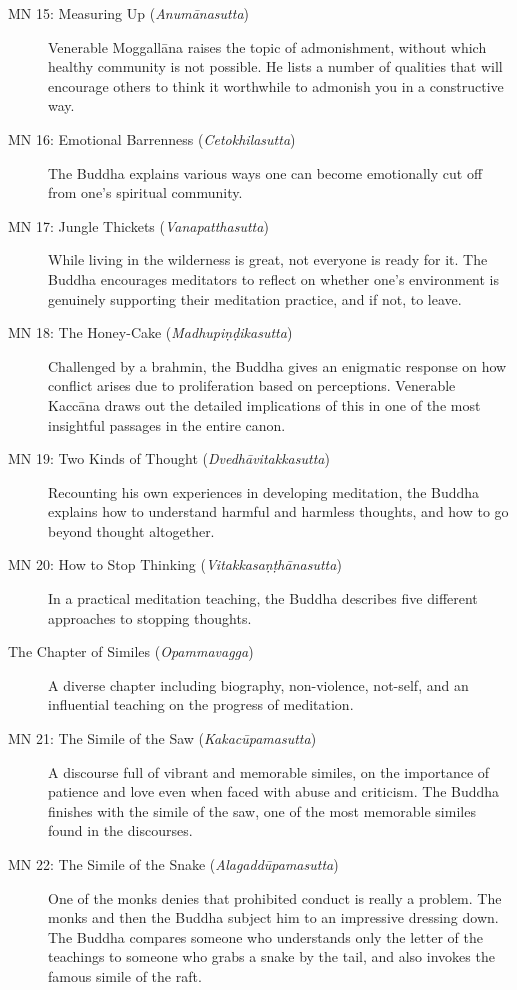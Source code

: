 \documentclass[12pt,openany]{book}%
\begin{document}
\begin{description}
\item[MN 15: Measuring Up (\textit{\textsanskrit{Anumānasutta}})] Venerable \textsanskrit{Moggallāna} raises the topic of admonishment, without which healthy community is not possible. He lists a number of qualities that will encourage others to think it worthwhile to admonish you in a constructive way.%
\item[MN 16: Emotional Barrenness (\textit{\textsanskrit{Cetokhilasutta}})] The Buddha explains various ways one can become emotionally cut off from one’s spiritual community.%
\item[MN 17: Jungle Thickets (\textit{\textsanskrit{Vanapatthasutta}})] While living in the wilderness is great, not everyone is ready for it. The Buddha encourages meditators to reflect on whether one’s environment is genuinely supporting their meditation practice, and if not, to leave.%
\item[MN 18: The Honey-Cake (\textit{\textsanskrit{Madhupiṇḍikasutta}})] Challenged by a brahmin, the Buddha gives an enigmatic response on how conflict arises due to proliferation based on perceptions. Venerable \textsanskrit{Kaccāna} draws out the detailed implications of this in one of the most insightful passages in the entire canon.%
\item[MN 19: Two Kinds of Thought (\textit{\textsanskrit{Dvedhāvitakkasutta}})] Recounting his own experiences in developing meditation, the Buddha explains how to understand harmful and harmless thoughts, and how to go beyond thought altogether.%
\item[MN 20: How to Stop Thinking (\textit{\textsanskrit{Vitakkasaṇṭhānasutta}})] In a practical meditation teaching, the Buddha describes five different approaches to stopping thoughts.%
\item[The Chapter of Similes (\textit{\textsanskrit{Opammavagga}})] A diverse chapter including biography, non-violence, not-self, and an influential teaching on the progress of meditation.%
\item[MN 21: The Simile of the Saw (\textit{\textsanskrit{Kakacūpamasutta}})] A discourse full of vibrant and memorable similes, on the importance of patience and love even when faced with abuse and criticism. The Buddha finishes with the simile of the saw, one of the most memorable similes found in the discourses.%
\item[MN 22: The Simile of the Snake (\textit{\textsanskrit{Alagaddūpamasutta}})] One of the monks denies that prohibited conduct is really a problem. The monks and then the Buddha subject him to an impressive dressing down. The Buddha compares someone who understands only the letter of the teachings to someone who grabs a snake by the tail, and also invokes the famous simile of the raft.%

\end{description}
\end{document}
